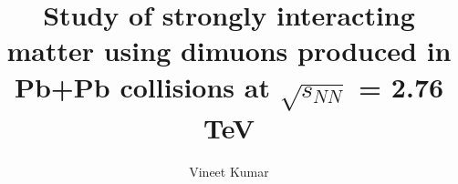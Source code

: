 \documentclass{mythesis}
\title{Study of strongly interacting matter using dimuons produced in Pb+Pb collisions at $\sqrt{s_{NN}}$ = 2.76 TeV}
\author{Vineet Kumar}
\begin{document}
\begin{frontmatter}
  
\end{frontmatter}

\begin{mainmatter}
  
  
  
    
    
  
\end{mainmatter}

\begin{appendices}
  
  
\end{appendices}

\begin{backmatter}
  
\end{backmatter}


\end{document}
